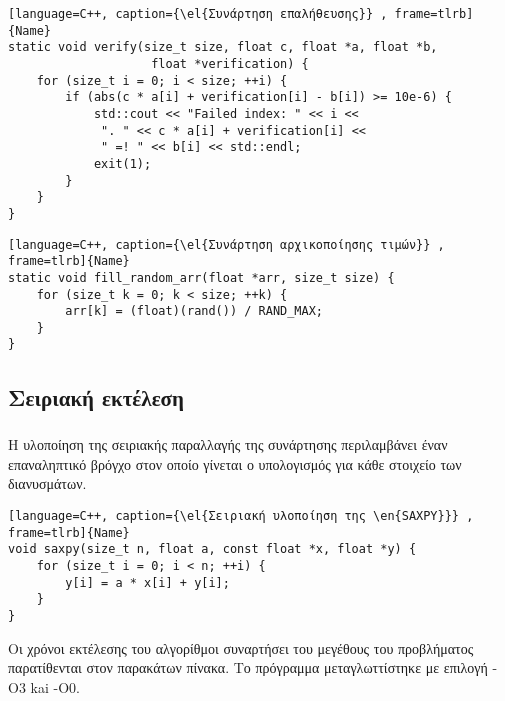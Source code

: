 \begin{spacing}{1}
\begin{lstlisting}[language=C++, caption={\el{Συνάρτηση επαλήθευσης}} , frame=tlrb]{Name}
static void verify(size_t size, float c, float *a, float *b, 
                    float *verification) {
    for (size_t i = 0; i < size; ++i) {
        if (abs(c * a[i] + verification[i] - b[i]) >= 10e-6) {
            std::cout << "Failed index: " << i <<
             ". " << c * a[i] + verification[i] << 
             " =! " << b[i] << std::endl;
            exit(1);
        }
    }
}
\end{lstlisting}
\end{spacing}

\begin{spacing}{1}
\begin{lstlisting}[language=C++, caption={\el{Συνάρτηση αρχικοποίησης τιμών}} , frame=tlrb]{Name}
static void fill_random_arr(float *arr, size_t size) {
    for (size_t k = 0; k < size; ++k) {
        arr[k] = (float)(rand()) / RAND_MAX;
    }
}       
\end{lstlisting}
\end{spacing}

\clearpage
\subsection{Σειριακή εκτέλεση}
\subparagraph{}
Η υλοποίηση της σειριακής παραλλαγής της συνάρτησης  περιλαμβάνει έναν επαναληπτικό 
βρόγχο στον οποίο γίνεται ο υπολογισμός για κάθε στοιχείο των διανυσμάτων.
\begin{spacing}{0.8}
\begin{lstlisting}[language=C++, caption={\el{Σειριακή υλοποίηση της \en{SAXPY}}} , frame=tlrb]{Name}
void saxpy(size_t n, float a, const float *x, float *y) {
    for (size_t i = 0; i < n; ++i) {
        y[i] = a * x[i] + y[i];
    }
}   
\end{lstlisting}
\end{spacing}

Οι χρόνοι εκτέλεσης του αλγορίθμοι συναρτήσει του μεγέθους του προβλήματος παρατίθενται στον παρακάτων πίνακα.
Το πρόγραμμα μεταγλωττίστηκε με επιλογή -O3 kai -O0.


